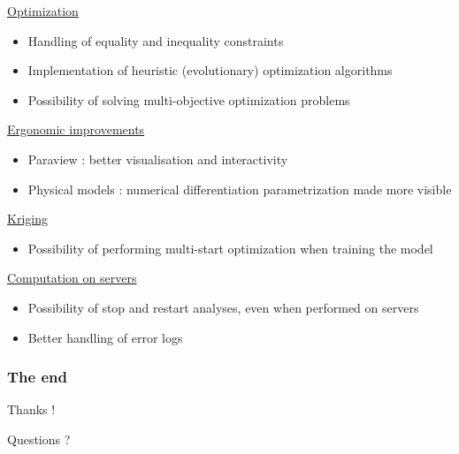 \documentclass[aspectratio=169]{beamer}
\begin{document}
\begin{frame}
\begin{small}


\begin{minipage}[t]{0.5\textwidth}
\underline{Optimization}
\begin{itemize}
\item Handling of equality and inequality constraints
\item Implementation of heuristic (evolutionary) optimization algorithms
\item Possibility of solving multi-objective optimization problems
\end{itemize}

\end{minipage}%
\begin{minipage}[t]{0.5\textwidth}
\underline{Ergonomic improvements}
\begin{itemize}
\item Paraview : better visualisation and interactivity
\item Physical models : numerical differentiation parametrization made more visible
\end{itemize}

\end{minipage}

\vspace{12pt}

\begin{minipage}[t]{0.5\textwidth}
\underline{Kriging}
\begin{itemize}
\item Possibility of performing multi-start optimization when training the model
\end{itemize}

\end{minipage}%
\begin{minipage}[t]{0.5\textwidth}
\underline{Computation on servers}
\begin{itemize}
\item Possibility of stop and restart analyses, even when performed on servers
\item Better handling of error logs
\end{itemize}
\end{minipage}
\end{small}
\end{frame}



\begin{frame}
\frametitle{The end}
\begin{center}
Thanks !
\end{center}

\begin{center}
Questions ?
\end{center}

\end{frame}


\end{document}
